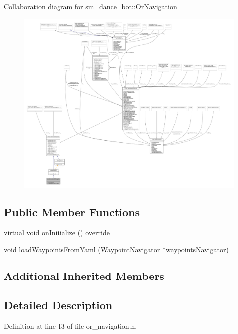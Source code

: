 Collaboration diagram for sm\+\_\+dance\+\_\+bot\+:\+:Or\+Navigation\+:
\nopagebreak
\begin{figure}[H]
\begin{center}
\leavevmode
\includegraphics[width=350pt]{classsm__dance__bot_1_1OrNavigation__coll__graph}
\end{center}
\end{figure}
\subsection*{Public Member Functions}
\begin{DoxyCompactItemize}
\item 
virtual void \hyperlink{classsm__dance__bot_1_1OrNavigation_a9f87c78f5af67024c9eda25097a135ac}{on\+Initialize} () override
\item 
void \hyperlink{classsm__dance__bot_1_1OrNavigation_a1f092ffe3a1b29ae9ea6623aff00ab16}{load\+Waypoints\+From\+Yaml} (\hyperlink{classmove__base__z__client_1_1WaypointNavigator}{Waypoint\+Navigator} $\ast$waypoints\+Navigator)
\end{DoxyCompactItemize}
\subsection*{Additional Inherited Members}


\subsection{Detailed Description}


Definition at line 13 of file or\+\_\+navigation.\+h.



